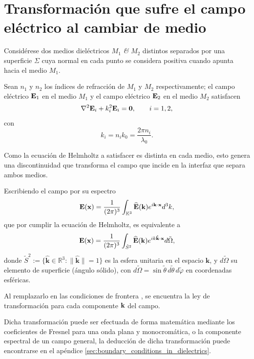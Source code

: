 \section{Transformación que sufre el campo eléctrico al cambiar de medio} 


Considérese dos medios dieléctricos $M_1$ \textit{\&} $M_2$ distintos separados por una superficie $\Sigma$ cuya normal en cada punto se considera positiva cuando apunta hacia el medio $M_1$.

Sean $n_1$ y $n_2$ los índices de refracción de $M_1$ y $M_2$ respectivamente; el campo eléctrico $\vb E_1$ en el medio $M_1$ y el campo eléctrico $\vb E_2$ en el medio $M_2$ satisfacen
\begin{equation}
  \nabla^2 \vb E_i + k_i^2 \vb E_i = \vb 0,
  \qquad
  i=1,2,
\end{equation}
con
\[
  k_i = n_i k_0 = \frac{2\pi n_i}{\lambda_0}.
\]

Como la ecuación de Helmholtz a satisfacer es distinta en cada medio, esto genera una discontinuidad que transforma el campo que incide en la interfaz que separa ambos medios.


Escribiendo el campo por su espectro
\begin{equation*} 
  \vb{E}(\vb x) = \frac{1}{(2\pi)^3} \int_{\mathbb K^3} \widehat{\vb{E}} (\vb{k}) e^{i\vb k \cdot \vb x} d^3k,
\end{equation*}
que por cumplir la ecuación de Helmholtz, es equivalente a
\begin{equation*} 
  \vb{E}(\vb x) = \frac{1}{(2\pi)^3} \int_{\tilde{S}^2} \widehat{\vb{E}} (\vb{k}) e^{ik \bm{\hat{\mathbf{k}}} \cdot \vb x} d\tilde{\Omega},
\end{equation*}
donde $\tilde S^2:=\{\hat{\mathbf k}\in\mathbb R^3:\|\hat{\mathbf k}\|=1\}$ es la esfera unitaria en el espacio $\mathbf{k}$, y $d\tilde\Omega$ su elemento de superficie (ángulo sólido), con $d\tilde\Omega=\sin\tilde\theta\,d\tilde\theta\,d\tilde\varphi$ en coordenadas esféricas.

Al remplazarlo en las condiciones de frontera \cite{jackson1999}, se encuentra la ley de transformación para cada componente $\vb k$ del campo.

Dicha transformación puede ser efectuada de forma matemática mediante los coeficientes de Fresnel para una onda plana y monocromática, o la componente espectral de un campo general, la deducción de dicha transformación puede encontrarse en el apéndice \ref{sec:boundary_conditions_in_dielectrics}.


